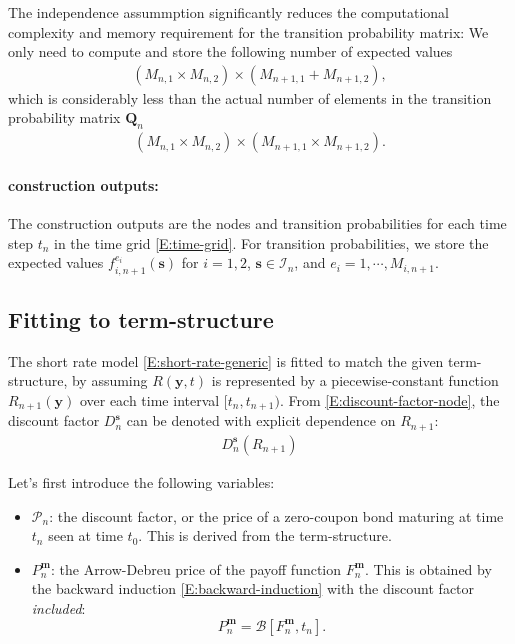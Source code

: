 \documentclass{texyise}
\newcommand{\indexset}{\mathcal{I}}
\newcommand{\valuebackward}{\mathcal{B}}
\begin{document}
The independence assummption significantly reduces the computational complexity and memory requirement for the transition probability matrix: We only need to compute and store the following number of expected values
\begin{eqnarray}
    (M_{n,1} \times M_{n,2}) \times (M_{n+1,1} + M_{n+1,2}),
\end{eqnarray}
which is considerably less than the actual number of elements in the transition probability matrix $\bm{Q}_n$
\begin{eqnarray}
    (M_{n,1} \times M_{n,2}) \times (M_{n+1,1} \times M_{n+1,2}).
\end{eqnarray}

\paragraph*{construction outputs:}

The construction outputs are the nodes and transition probabilities for each time step $t_n$ in the time grid \eqref{E:time-grid}. For transition probabilities, we store the expected values $f_{i,n+1}^{e_i}(\bm{s})$ for $i = 1, 2$, $\bm{s} \in \indexset_n$, and $e_i = 1, \cdots, M_{i,n+1}$.

\subsection{Fitting to term-structure}
\label{S:fitting-term-structure}

The short rate model \eqref{E:short-rate-generic} is fitted to match the given term-structure, by assuming $R(\bm{y}, t)$ is represented by a piecewise-constant function $R_{n+1}(\bm{y})$ over each 
time interval $[t_n, t_{n+1})$. From \eqref{E:discount-factor-node}, the discount factor $D_n^{\bm{s}}$ can be denoted with explicit dependence on $R_{n+1}$: 
\begin{eqnarray}
    D_n^{\bm{s}}(R_{n+1})
\end{eqnarray}

Let's first introduce the following variables:
\begin{itemize}
    \item $\mathcal{P}_n$: the discount factor, or the price of a zero-coupon bond maturing at time $t_n$ seen at time $t_0$. This is derived from the term-structure.
    \item $P_n^{\bm{m}}$: the Arrow-Debreu price of the payoff function $F_n^{\bm{m}}$. This is obtained by the backward induction \eqref{E:backward-induction} with the discount factor {\em included}:
    \begin{equation}
        P_n^{\bm{m}} = \valuebackward[F_n^{\bm{m}}, t_n].
    \end{equation}
\end{itemize}
\end{document}
